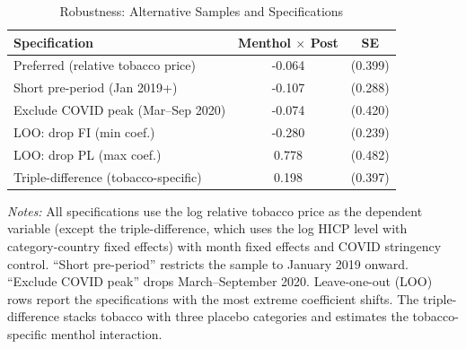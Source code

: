\begin{table}[H]
\centering
\caption{Robustness: Alternative Samples and Specifications}
\label{tab:robust}
\begin{threeparttable}
\begin{tabular}{lcc}
\toprule
Specification & Menthol $\times$ Post & SE \\
\midrule
Preferred (relative tobacco price) & -0.064 & (0.399) \\
Short pre-period (Jan 2019+) & -0.107 & (0.288) \\
Exclude COVID peak (Mar--Sep 2020) & -0.074 & (0.420) \\
LOO: drop FI (min coef.) & -0.280 & (0.239) \\
LOO: drop PL (max coef.) & 0.778 & (0.482) \\
Triple-difference (tobacco-specific) & 0.198 & (0.397) \\
\bottomrule
\end{tabular}
\begin{tablenotes}[flushleft]
\small
\item \textit{Notes:} All specifications use the log relative tobacco price as the dependent variable (except the triple-difference, which uses the log HICP level with category-country fixed effects) with month fixed effects and COVID stringency control. ``Short pre-period'' restricts the sample to January 2019 onward. ``Exclude COVID peak'' drops March--September 2020. Leave-one-out (LOO) rows report the specifications with the most extreme coefficient shifts. The triple-difference stacks tobacco with three placebo categories and estimates the tobacco-specific menthol interaction.
\end{tablenotes}
\end{threeparttable}
\end{table}

